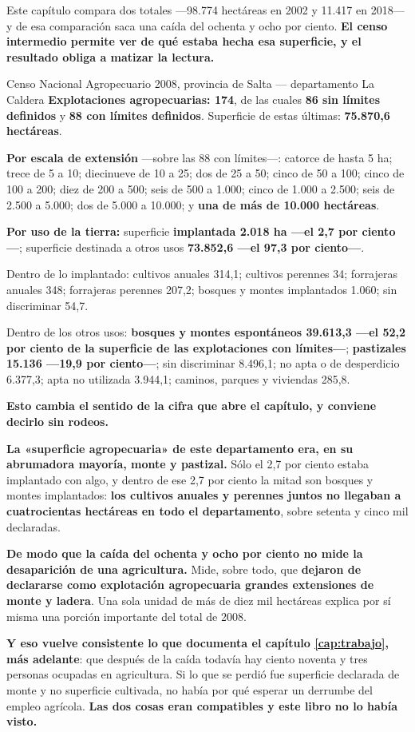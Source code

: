 Este capítulo compara dos totales ---98.774 hectáreas en 2002 y 11.417 en 2018--- y de esa
comparación saca una caída del ochenta y ocho por ciento. \textbf{El censo intermedio permite
ver de qué estaba hecha esa superficie, y el resultado obliga a matizar la lectura.}

\begin{ficha}{Censo Nacional Agropecuario 2008, provincia de Salta --- departamento La Caldera}
\textbf{Explotaciones agropecuarias: 174}, de las cuales \textbf{86 sin límites definidos} y
\textbf{88 con límites definidos}. Superficie de estas últimas: \textbf{75.870,6 hectáreas}.

\textbf{Por escala de extensión} ---sobre las 88 con límites---: catorce de hasta 5 ha; trece de
5 a 10; diecinueve de 10 a 25; dos de 25 a 50; cinco de 50 a 100; cinco de 100 a 200; diez de
200 a 500; seis de 500 a 1.000; cinco de 1.000 a 2.500; seis de 2.500 a 5.000; dos de 5.000 a
10.000; y \textbf{una de más de 10.000 hectáreas}.

\textbf{Por uso de la tierra:} superficie \textbf{implantada 2.018 ha ---el 2,7 por ciento---};
superficie destinada a otros usos \textbf{73.852,6 ---el 97,3 por ciento---}.

Dentro de lo implantado: cultivos anuales 314,1; cultivos perennes 34; forrajeras anuales 348;
forrajeras perennes 207,2; bosques y montes implantados 1.060; sin discriminar 54,7.

Dentro de los otros usos: \textbf{bosques y montes espontáneos 39.613,3 ---el 52,2 por ciento de la superficie de las explotaciones con límites---}; \textbf{pastizales 15.136 ---19,9 por ciento---}; sin
discriminar 8.496,1; no apta o de desperdicio 6.377,3; apta no utilizada 3.944,1; caminos,
parques y viviendas 285,8.
\end{ficha}

\begin{cautela}
\textbf{Esto cambia el sentido de la cifra que abre el capítulo, y conviene decirlo sin
rodeos.}

\textbf{La «superficie agropecuaria» de este departamento era, en su abrumadora mayoría, monte y
pastizal.} Sólo el 2,7 por ciento estaba implantado con algo, y dentro de ese 2,7 por ciento la
mitad son bosques y montes implantados: \textbf{los cultivos anuales y perennes juntos no llegaban a
cuatrocientas hectáreas en todo el departamento}, sobre setenta y cinco mil declaradas.

\textbf{De modo que la caída del ochenta y ocho por ciento no mide la desaparición de una
agricultura.} Mide, sobre todo, que \textbf{dejaron de declararse como explotación
agropecuaria grandes extensiones de monte y ladera}. Una sola unidad de más de diez mil
hectáreas explica por sí misma una porción importante del total de 2008.

\textbf{Y eso vuelve consistente lo que documenta el capítulo \ref{cap:trabajo}, más adelante}: que después de
la caída todavía hay ciento noventa y tres personas ocupadas en agricultura. Si lo que se
perdió fue superficie declarada de monte y no superficie cultivada, no había por qué esperar un
derrumbe del empleo agrícola. \textbf{Las dos cosas eran compatibles y este libro no lo había
visto.}
\end{cautela}

